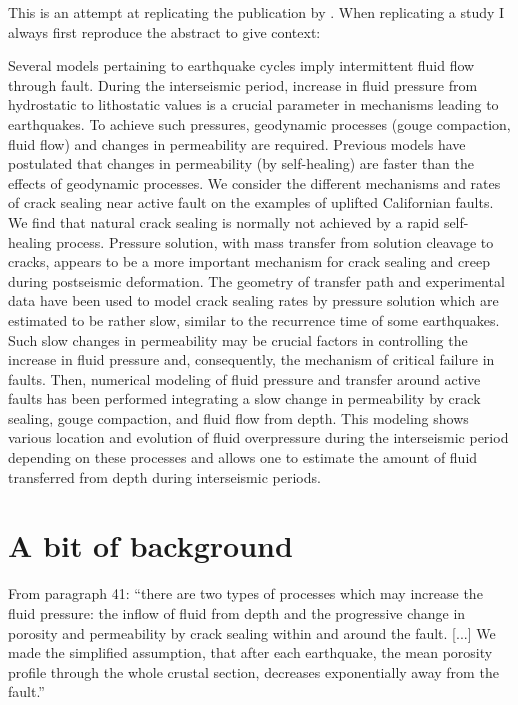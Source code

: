 
This is an attempt at replicating the publication by .
When replicating a study I always first reproduce the abstract to give context:
\begin{displayquote}
{\color{darkgray}
Several models pertaining to earthquake cycles imply intermittent fluid flow through
fault. During the interseismic period, increase in fluid pressure from hydrostatic to
lithostatic values is a crucial parameter in mechanisms leading to earthquakes. To achieve
such pressures, geodynamic processes (gouge compaction, fluid flow) and changes in
permeability are required. Previous models have postulated that changes in permeability
(by self-healing) are faster than the effects of geodynamic processes. We consider the
different mechanisms and rates of crack sealing near active fault on the examples of
uplifted Californian faults. We find that natural crack sealing is normally not achieved by a
rapid self-healing process. Pressure solution, with mass transfer from solution cleavage to
cracks, appears to be a more important mechanism for crack sealing and creep during
postseismic deformation. The geometry of transfer path and experimental data have been
used to model crack sealing rates by pressure solution which are estimated to be rather
slow, similar to the recurrence time of some earthquakes. Such slow changes in
permeability may be crucial factors in controlling the increase in fluid pressure and,
consequently, the mechanism of critical failure in faults. Then, numerical modeling of
fluid pressure and transfer around active faults has been performed integrating a slow
change in permeability by crack sealing, gouge compaction, and fluid flow from depth.
This modeling shows various location and evolution of fluid overpressure during the
interseismic period depending on these processes and allows one to estimate the amount of
fluid transferred from depth during interseismic periods.
}
\end{displayquote}


\section*{A bit of background}

From paragraph 41: ``there are two types of processes
which may increase the fluid pressure: the inflow of fluid
from depth and the progressive change in porosity and
permeability by crack sealing within and around the fault.
[...] 
We made the simplified assumption, that after each earthquake, 
the mean porosity profile
through the whole crustal section, decreases exponentially
away from the fault.''

